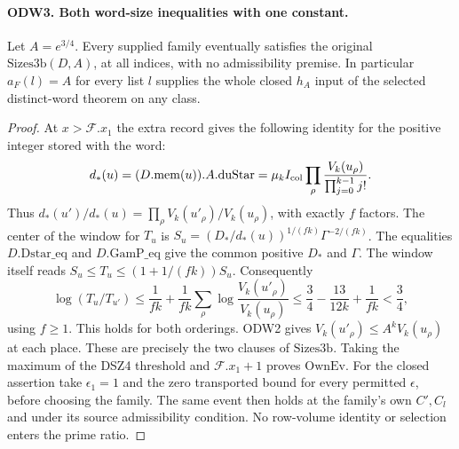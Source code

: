 \paragraph{ODW3. Both word-size inequalities with one constant.}
\label{claim:ODW3}
Let $A=e^{3/4}$. Every supplied family eventually satisfies the
original $\mathrm{Sizes3b}(D,A)$, at all indices, with no
admissibility premise. In particular $a_F(l)=A$ for every list
$l$ supplies the whole closed $h_A$ input of the selected
distinct-word theorem on any class.
\begin{proof}
At $x>\mathcal F.x_1$ the extra record gives the following
identity for the positive integer stored with the word:
\[
 d_*(u)=(D.\mathrm{mem}(u)).A.\mathrm{duStar}
       =\mu_k I_{\rm col}\prod_\rho
       \frac{V_k(u_\rho)}{\prod_{j=0}^{k-1}j!}.
\]
Thus $d_*(u')/d_*(u)=\prod_\rho V_k(u'_\rho)/V_k(u_\rho)$,
with exactly $f$ factors. The center of the window for $T_u$ is
$S_u=(D_*/d_*(u))^{1/(fk)}\Gamma^{-2/(fk)}$.
The equalities $D.\mathrm{Dstar\_eq}$ and $D.\mathrm{GamP\_eq}$
give the common positive $D_*$ and $\Gamma$.
The window itself reads $S_u\le T_u\le(1+1/(fk))S_u$.
Consequently
\[
 \log(T_u/T_{u'})
 \le \frac1{fk}+\frac1{fk}\sum_\rho
                \log\frac{V_k(u'_\rho)}{V_k(u_\rho)}
 \le \frac34-\frac{13}{12k}+\frac1{fk}<\frac34 ,
\]
using $f\ge1$. This holds for both orderings.
ODW2 gives $V_k(u'_\rho)\le A^k V_k(u_\rho)$ at each place.
These are precisely the two clauses of $\mathrm{Sizes3b}$.
Taking the maximum of the DSZ4 threshold and
$\mathcal F.x_1+1$ proves $\mathrm{OwnEv}$.
For the closed assertion take $\epsilon_1=1$ and the zero
transported bound for every permitted $\epsilon$, before choosing
the family. The same event then holds at the family's own $C',C_l$
and under its source admissibility condition. No row-volume identity
or selection enters the prime ratio.
\end{proof}

